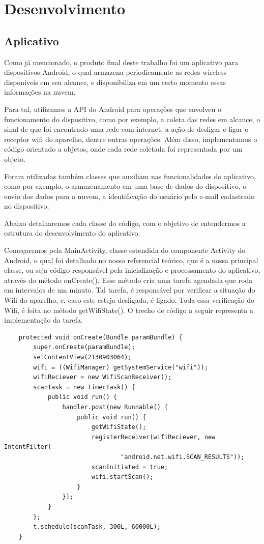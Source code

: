 \documentclass[12pt, %
openright, 
oneside,
a4paper,
brazil]{facom-ufu-abntex2}
\begin{document}
\chapter{Desenvolvimento}

\section{Aplicativo}
Como já mencionado, o produto final deste trabalho foi um aplicativo para dispositivos Android, o qual armazena periodicamente as redes wireless disponíveis em seu alcance, e disponibiliza em um certo momento essas informações na nuvem.

Para tal, utilizamos a API do Android para operações que envolveu o funcionamento do dispositivo, como por exemplo, a coleta das redes em alcance, o sinal de que foi encontrado uma rede com internet, a ação de desligar e ligar o receptor wifi do aparelho, dentre outras operações. Além disso, implementamos o código orientado a objetos, onde cada rede coletada foi representada por um objeto.

Foram utilizadas também classes que auxiliam nas funcionalidades do aplicativo, como por exemplo, o armazenamento em uma base de dados do dispositivo, o envio dos dados para a nuvem, a identificação do usuário pelo e-mail cadastrado no dispositivo.

Abaixo detalharemos cada classe do código, com o objetivo de entendermos a estrutura do desenvolvimento do aplicativo.

Começaremos pela MainActivity, classe estendida do componente Activity do Android, o qual foi detalhado no nosso referencial teórico, que é a nossa principal classe, ou seja código responsável pela inicialização e processamento do aplicativo, através do método onCreate(). Esse método cria uma tarefa agendada que roda em intervalos de um minuto. Tal tarefa, é responsável por verificar a situação do Wifi do aparelho, e, caso este esteja desligado, é ligado. Toda essa verificação do Wifi, é feita no método getWifiState(). O trecho de código a seguir representa a implementação da tarefa.
\begin{lstlisting}
	protected void onCreate(Bundle paramBundle) {
		super.onCreate(paramBundle);
		setContentView(2130903064);
		wifi = ((WifiManager) getSystemService("wifi"));
		wifiReciever = new WifiScanReceiver();
		scanTask = new TimerTask() {
			public void run() {
				handler.post(new Runnable() {
					public void run() {
						getWifiState();
						registerReceiver(wifiReciever, new IntentFilter(
								"android.net.wifi.SCAN_RESULTS"));
						scanInitiated = true;
						wifi.startScan();
					}
				});
			}
		};
		t.schedule(scanTask, 300L, 60000L);
	}
\end{lstlisting}
\end{document}
